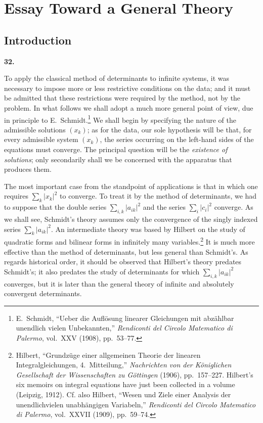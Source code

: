 \documentclass[
  paper=b5,
  fontsize=13pt,
  twoside=true,
  open=any,
  bookmarkpackage=false,
  chapterprefix=true,
  headings=normal
]{scrbook}
\theoremstyle{definition}
\newcommand{\numberedparagraph}[1]{%
  \par\medskip\phantomsection\label{sec:#1}%
  \noindent\textbf{#1.}\enspace
}
\begin{document}
\chapter{Essay Toward a General Theory}\label{chap:3}

\section{Introduction}

\numberedparagraph{32}
To apply the classical method of determinants to infinite systems, it was necessary to impose more or less restrictive conditions on the data; and it must be admitted that these restrictions were required by the method, not by the problem. In what follows we shall adopt a much more general point of view, due in principle to E.~Schmidt.\footnote{E.~Schmidt, ``Ueber die Aufl\"osung linearer Gleichungen mit abz\"ahlbar unendlich vielen Unbekannten,'' \emph{Rendiconti del Circolo Matematico di Palermo}, vol.~XXV (1908), pp.~53--77.} We shall begin by specifying the nature of the admissible solutions $(x_k)$; as for the data, our sole hypothesis will be that, for every admissible system $(x_k)$, the series occurring on the left-hand sides of the equations must converge. The principal question will be the \emph{existence of solutions}; only secondarily shall we be concerned with the apparatus that produces them.

The most important case from the standpoint of applications is that in which one requires $\sum_k |x_k|^2$ to converge. To treat it by the method of determinants, we had to suppose that the double series $\sum_{i,k}|a_{ik}|^2$ and the series $\sum_i|c_i|^2$ converge. As we shall see, Schmidt's theory assumes only the convergence of the singly indexed series $\sum_k|a_{ik}|^2$. An intermediate theory was based by Hilbert on the study of quadratic forms and bilinear forms
in infinitely many variables.\footnote{Hilbert, ``Grundz\"uge einer allgemeinen Theorie der linearen Integralgleichungen, 4.~Mitteilung,'' \emph{Nachrichten von der K\"oniglichen Gesellschaft der Wissenschaften zu G\"ottingen} (1906), pp.~157--227. Hilbert's six memoirs on integral equations have just been collected in a volume (Leipzig, 1912). Cf. also Hilbert, ``Wesen und Ziele einer Analysis der unendlichvielen unabh\"angigen Variabeln,'' \emph{Rendiconti del Circolo Matematico di Palermo}, vol.~XXVII (1909), pp.~59--74.} It is much more effective than the method of determinants, but less general than Schmidt's. As regards historical order, it should be observed that Hilbert's theory predates Schmidt's; it also predates the study of determinants for which $\sum_{i,k}|a_{ik}|^2$ converges, but it is later than the general theory of infinite and absolutely convergent determinants.
\end{document}
